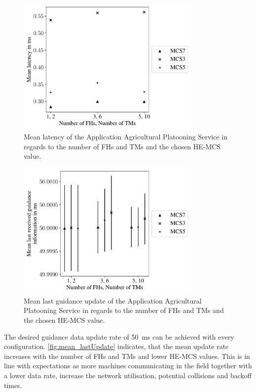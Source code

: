 \begin{figure}[]%
	\centering
	\includegraphics[width=0.8\textwidth]{figures/mean_scatter_2latency}
	\caption{Mean latency of the Application Agricultural Platooning Service in regards to the number of \ac{FH}s and \ac{TM}s and
	the chosen \ac{HE}-\ac{MCS} value.}
	\label{fig:mean_latency}%
\end{figure}
\begin{figure}[]%
	\centering
	\includegraphics[width=0.8\textwidth]{figures/mean_scatter_2lastUpdate}
	\caption{Mean last guidance update of the Application Agricultural Platooning Service in regards to the number of \ac{FH}s and \ac{TM}s and
	the chosen \ac{HE}-\ac{MCS} value.}
	\label{fig:mean_lastUpdate}%
\end{figure}


The desired guidance data update rate  of \SI{50}{\milli\second} can be achieved with every
configuration. \autoref{fig:mean_lastUpdate} indicates, that the mean update rate increases with the number of \ac{FH}s and \ac{TM}s and
lower \ac{HE}-\ac{MCS} values.
This is in line with expectations as more machines communicating in the field together with a lower data rate, increase the network utilisation, potential collisions and backoff times.

